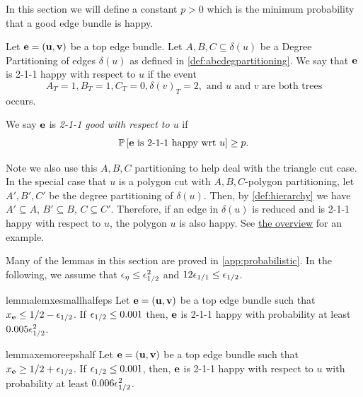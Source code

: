 In this section we will define a constant $p>0$ which is the minimum  probability that a good edge bundle is happy.
\begin{definition}
\label{dfn:211happygood}
Let  ${\bf e}={\bf (u,v)}$ be a top edge bundle. 
Let $A,B,C\subseteq \delta(u)$ be a Degree Partitioning of edges $\delta(u)$ as defined in \cref{def:abcdegpartitioning}.
We say that ${\bf e}$ is 2-1-1 happy with respect to $u$ if the event 
$$A_T=1,B_T=1,C_T=0,\delta(v)_T=2,\text{ and $u$ and $v$ are both trees}$$ occurs.

We say ${\bf e}$ is {\em 2-1-1 good with respect to $u$} if $${\mathbb{P}}\left[{\bf e} \text{ is 2-1-1 happy wrt $u$}\right]\geq p.$$
\end{definition}
\begin{remark}\label{rem:poly-and-degree-partition} Note we also use this $A,B,C$ partitioning to help deal with the triangle cut case. In the special case that $u$ is a polygon cut with $A,B,C$-polygon partitioning, let $A',B',C'$ be the degree partitioning of $\delta(u)$. Then, by \cref{def:hierarchy} we have $A' \subseteq A$, $B' \subseteq B$, $C \subseteq C'$. Therefore, if an edge in $\delta(u)$ is reduced and is 2-1-1 happy with respect to $u$, the polygon $u$ is also happy. See \hyperlink{211-explanation}{the overview} for an example.\end{remark}

Many of the lemmas in this section are proved in \cref{app:probabilistic}. In the following, we assume that ${\epsilon}_\eta \le {\epsilon}_{1/2}^2$ and $12{\epsilon}_{1/1}\leq {\epsilon}_{1/2}$.

\begin{restatable}{lemma}{lemxesmallhalfeps}\label{lem:x_e<=1/2-eps1}
Let ${\bf e}={\bf (u,v)}$ be a top edge bundle such that $x_{\bf e}\leq 1/2-{\epsilon}_{1/2}$. If ${\epsilon}_{1/2}\leq 0.001$ then, ${\bf e}$ is 2-1-1 happy with probability at least $0.005{\epsilon}_{1/2}^2$.
\end{restatable}


\begin{restatable}{lemma}{xemoreepshalf}\label{lem:x_e>=1/2+eps_1/2}
Let ${\bf e}={\bf (u,v)}$ be a top edge bundle such that $x_{\bf e}\geq 1/2+{\epsilon}_{1/2}$. If ${\epsilon}_{1/2}\leq 0.001$, then, ${\bf e}$ is 2-1-1 happy with respect to $u$ with probability at least $0.006{\epsilon}_{1/2}^2$.
\end{restatable}

